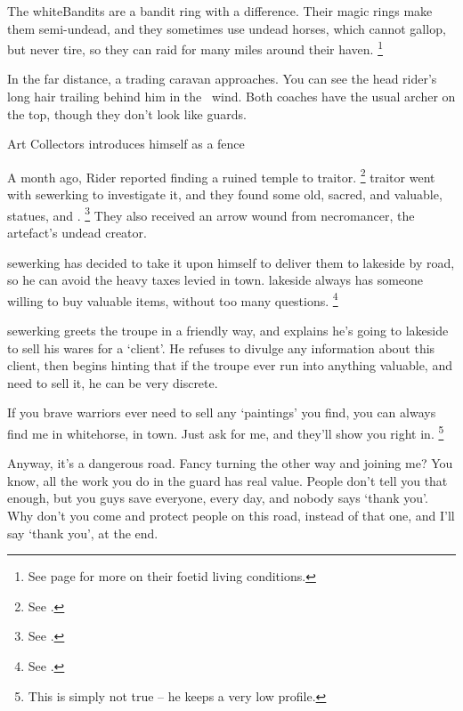 
\noindent
The \gls{whiteBandits} are a bandit ring with a difference.
Their magic rings make them semi-undead, and they sometimes use undead horses, which cannot gallop, but never tire, so they can raid for many miles around their haven.%
\footnote{See page \pageref{necromancers_lair} for more on their foetid living conditions.}

\begin{boxtext}
  In the far distance, a trading caravan approaches.
  You can see the head rider's long hair trailing behind him in the \showTemperature\ wind.
  Both coaches have the usual archer on the top, though they don't look like \glspl{guard}.
\end{boxtext}


{Art Collectors}%
{ introduces himself as a fence}%

\begin{exampletext}
  A month ago,  Rider reported finding a ruined temple to \gls{traitor}.%
  \footnote{See .}
  \Gls{traitor} went with \gls{sewerking} to investigate it, and they found some old, sacred, and valuable, statues, and .%
  \footnote{See .}
  They also received an arrow wound from \gls{necromancer}, the \gls{artefact}'s undead creator.

  \Gls{sewerking} has decided to take it upon himself to deliver them to \gls{lakeside} by road, so he can avoid the heavy taxes levied in \gls{town}.%
  \Gls{lakeside} always has someone willing to buy valuable items, without too many questions.%
  \footnote{See .}
\end{exampletext}

\setcounter{wounds}{2}

\sewerking


\Gls{sewerking} greets the troupe in a friendly way, and explains he's going to \gls{lakeside} to sell his wares for a `client'.
He refuses to divulge any information about this client, then begins hinting that if the troupe ever run into anything valuable, and need to sell it, he can be very discrete.

\begin{speechtext}
  If you brave warriors ever need to sell any `paintings' you find, you can always find me in \gls{whitehorse}, in \gls{town}.
  Just ask for me, and they'll show you right in.%
  \footnote{This is simply not true -- he keeps a very low profile.}

  Anyway, it's a dangerous road.
  Fancy turning the other way and joining me?
  You know, all the work you do in the \gls{guard} has real value.
  People don't tell you that enough, but you guys save everyone, every day, and nobody says `thank you'.
  Why don't you come and protect people on this road, instead of that one, and I'll say `thank you', at the end.
\end{speechtext}

